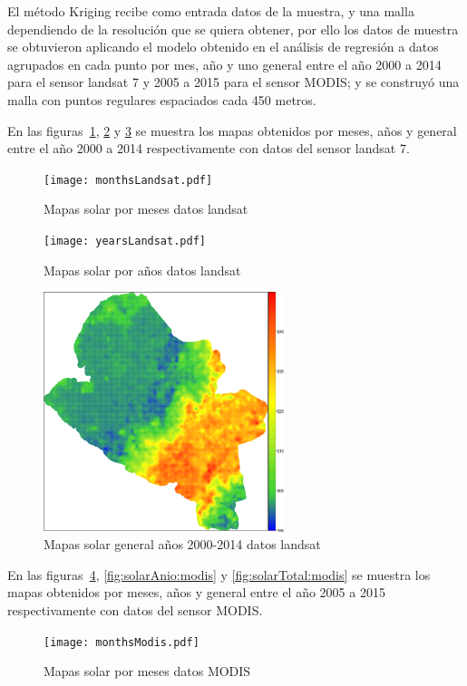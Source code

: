 El método Kriging recibe como entrada datos de la muestra, y una malla dependiendo de la resolución que se quiera obtener, por ello los datos de muestra se
obtuvieron aplicando el modelo obtenido en el análisis de regresión a datos agrupados en cada punto por mes, año y uno
general entre el año 2000 a 2014 para el sensor landsat 7 y 2005 a 2015 para el sensor MODIS; y se 
 construyó una malla con puntos regulares espaciados cada 450 metros. 
 
 En las figuras~\ref{fig:solarMes:landsat}, \ref{fig:solarAnio:landsat} y \ref{fig:solarTotal:landsat}  se muestra los mapas 
 obtenidos por meses, años y general entre el año 2000 a 2014 respectivamente con datos del sensor landsat 7. 
 
\begin{figure}
  \centering
  \texttt{[image: monthsLandsat.pdf]}
  \caption{Mapas solar por meses datos landsat}
  \label{fig:solarMes:landsat}
\end{figure}

\begin{figure}
  \centering
  \texttt{[image: yearsLandsat.pdf]}
  \caption{Mapas solar por años datos landsat}
  \label{fig:solarAnio:landsat}
\end{figure}

\begin{figure}
  \centering
  \includegraphics[width = 7cm]{generalLandsat.pdf}
  \caption{Mapas solar general años 2000-2014 datos landsat}
  \label{fig:solarTotal:landsat}
\end{figure}

 En las figuras~\ref{fig:solarMes:modis}, \ref{fig:solarAnio:modis} y \ref{fig:solarTotal:modis}  se muestra los mapas 
 obtenidos por meses, años y general entre el año 2005 a 2015 respectivamente con datos del sensor MODIS. 
 
\begin{figure}
  \centering
  \texttt{[image: monthsModis.pdf]}
  \caption{Mapas solar por meses datos MODIS}
  \label{fig:solarMes:modis}
\end{figure}

